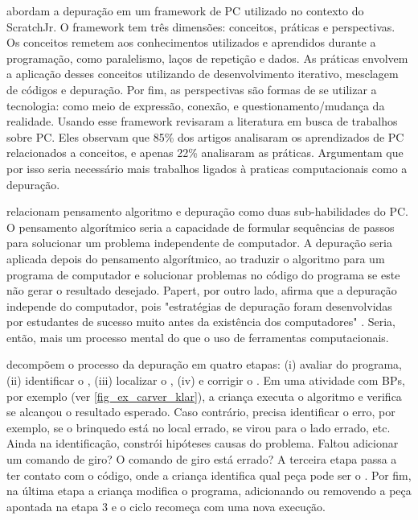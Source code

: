  abordam a depuração em um framework de PC utilizado no contexto do ScratchJr. O framework tem três dimensões: conceitos, práticas e perspectivas. Os conceitos remetem aos conhecimentos utilizados e aprendidos durante a programação, como paralelismo, laços de repetição e dados. As práticas envolvem a aplicação desses conceitos utilizando de desenvolvimento iterativo, mesclagem de códigos e depuração. Por fim, as perspectivas são formas de se utilizar a tecnologia: como meio de expressão, conexão, e questionamento/mudança da realidade. Usando esse framework  revisaram a literatura em busca de trabalhos sobre PC. Eles observam que 85\% dos artigos analisaram os aprendizados de PC relacionados a conceitos, e apenas 22\% analisaram as práticas. Argumentam que por isso seria necessário mais trabalhos ligados à praticas computacionais como a depuração.

 relacionam pensamento algoritmo e depuração como duas sub-habilidades do PC. O pensamento algorítmico seria a capacidade de formular sequências de passos para solucionar um problema independente de computador. A depuração seria aplicada depois do pensamento algorítmico, ao traduzir o algoritmo para um programa de computador e solucionar problemas no código do programa se este não gerar o resultado desejado. Papert, por outro lado, afirma que a depuração independe do computador, pois "estratégias de depuração foram desenvolvidas por estudantes de sucesso muito antes da existência dos computadores" \cite[p.23]{papert_mindstorms:_1980}. Seria, então, mais um processo mental do que o uso de ferramentas computacionais.

 decompõem o processo da depuração em quatro etapas: (i) avaliar do programa, (ii) identificar o \bug, (iii) localizar o \bug, (iv) e corrigir o \bug. Em uma atividade com BPs, por exemplo (ver \autoref{fig_ex_carver_klar}), a criança executa o algoritmo e verifica se alcançou o resultado esperado. Caso contrário, precisa identificar o erro, por exemplo, se o brinquedo está no local errado, se virou para o lado errado, etc. Ainda na identificação, constrói hipóteses causas do problema. Faltou adicionar um comando de giro? O comando de giro está errado? A terceira etapa passa a ter contato com o código, onde a criança identifica qual peça pode ser o \bug. Por fim, na última etapa a criança modifica o programa, adicionando ou removendo a peça apontada na etapa 3 e o ciclo recomeça com uma nova execução.

